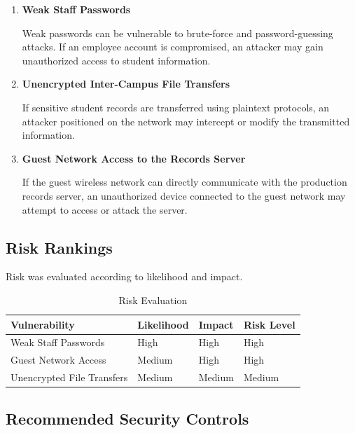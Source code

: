 \documentclass[12pt,a4paper]{article}
\begin{document}
\begin{enumerate}

    \item \textbf{Weak Staff Passwords}

    Weak passwords can be vulnerable to brute-force and password-guessing attacks. If an employee account is compromised, an attacker may gain unauthorized access to student information.

    \item \textbf{Unencrypted Inter-Campus File Transfers}

    If sensitive student records are transferred using plaintext protocols, an attacker positioned on the network may intercept or modify the transmitted information.

    \item \textbf{Guest Network Access to the Records Server}

    If the guest wireless network can directly communicate with the production records server, an unauthorized device connected to the guest network may attempt to access or attack the server.

\end{enumerate}

\subsection{Risk Rankings}

Risk was evaluated according to likelihood and impact.

\begin{table}[htbp]
\centering
\caption{Risk Evaluation}
\begin{tabular}{p{5cm} p{3cm} p{3cm} p{3cm}}
\toprule
\textbf{Vulnerability} & \textbf{Likelihood} & \textbf{Impact} & \textbf{Risk Level} \\
\midrule

Weak Staff Passwords &
High &
High &
High \\

Guest Network Access &
Medium &
High &
High \\

Unencrypted File Transfers &
Medium &
Medium &
Medium \\

\bottomrule
\end{tabular}
\end{table}

\subsection{Recommended Security Controls}
\end{document}
